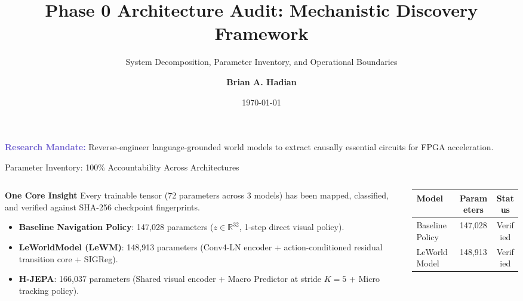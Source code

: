 \documentclass[aspectratio=169, 10pt]{beamer}
\title[Phase 0 Architecture Audit]{\textbf{Phase 0 Architecture Audit: Mechanistic Discovery Framework}}
\subtitle{System Decomposition, Parameter Inventory, and Operational Boundaries}
\author{\textbf{Brian A. Hadian}}
\institute[Embedded AI \& Robotics]{\textbf{Project Hephaestus: Autonomous Robotics \& Hardware Lab}}
\date{\today}
\begin{document}
\begin{frame}
  \titlepage
  \begin{center}
    \footnotesize \textcolor{SlateBlue}{\textbf{Research Mandate:}} Reverse-engineer language-grounded world models to extract causally essential circuits for FPGA acceleration.
  \end{center}
\end{frame}

\begin{frame}{Parameter Inventory: 100\% Accountability Across Architectures}
  \begin{columns}
    \begin{column}{0.54\textwidth}
      \begin{block}{\textbf{One Core Insight}}
        Every trainable tensor (72 parameters across 3 models) has been mapped, classified, and verified against SHA-256 checkpoint fingerprints.
      \end{block}
      \vspace{0.3em}
      \begin{itemize}
        \footnotesize
        \item \textbf{Baseline Navigation Policy}: 147,028 parameters ($z \in \mathbb{R}^{32}$, 1-step direct visual policy).
        \item \textbf{LeWorldModel (LeWM)}: 148,913 parameters (Conv4-LN encoder + action-conditioned residual transition core + SIGReg).
        \item \textbf{H-JEPA}: 166,037 parameters (Shared visual encoder + Macro Predictor at stride $K=5$ + Micro tracking policy).
      \end{itemize}
    \end{column}
    \begin{column}{0.44\textwidth}
      \centering
      \scriptsize
      \begin{tabular}{lcc}
        \toprule
        \textbf{Model} & \textbf{Parameters} & \textbf{Status} \\
        \midrule
        Baseline Policy & 147,028 & Verified \\
        LeWorldModel & 148,913 & Verified \\

\end{tabular}
\end{column}
\end{columns}
\end{frame}
\end{document}
